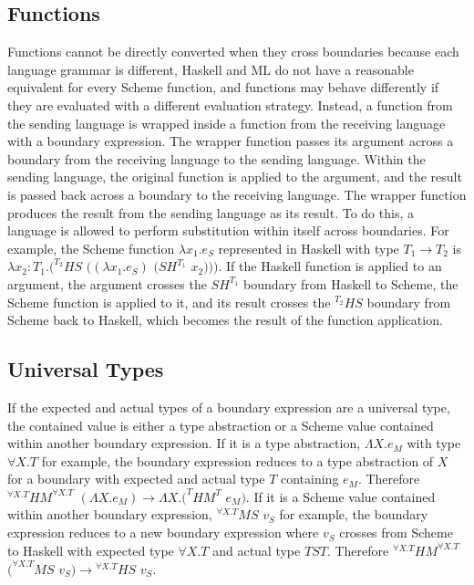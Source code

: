 \subsection{Functions}

Functions cannot be directly converted when they cross boundaries because each language grammar is different, Haskell and ML do not have a reasonable equivalent for every Scheme function, and functions may behave differently if they are evaluated with a different evaluation strategy.  Instead, a function from the sending language is wrapped inside a function from the receiving language with a boundary expression.  The wrapper function passes its argument across a boundary from the receiving language to the sending language.  Within the sending language, the original function is applied to the argument, and the result is passed back across a boundary to the receiving language.  The wrapper function produces the result from the sending language as its result.  To do this, a language is allowed to perform substitution within itself across boundaries.  For example, the Scheme function $\lambda x_{1}.e_{S}$ represented in Haskell with type $T_{1}\rightarrow T_{2}$ is $\lambda x_{2}:T_{1}.(^{T_{2}}HS$ $((\lambda x_{1}.e_{S})$ $(SH^{T_{1}}$ $x_{2})))$.  If the Haskell function is applied to an argument, the argument crosses the $SH^{T_{1}}$ boundary from Haskell to Scheme, the Scheme function is applied to it, and its result crosses the $^{T_{2}}HS$ boundary from Scheme back to Haskell, which becomes the result of the function application.

\subsection{Universal Types}

If the expected and actual types of a boundary expression are a universal type, the contained value is either a type abstraction or a Scheme value contained within another boundary expression.  If it is a type abstraction, $\Lambda X.e_{M}$ with type $\forall X.T$ for example, the boundary expression reduces to a type abstraction of $X$ for a boundary with expected and actual type $T$ containing $e_{M}$.  Therefore $^{\forall X.T}HM^{\forall X.T}$ $(\Lambda X.e_{M})\rightarrow\Lambda X.(^{T}HM^{T}$ $e_{M})$.  If it is a Scheme value contained within another boundary expression, $^{\forall X.T}MS$ $v_{S}$ for example, the boundary expression reduces to a new boundary expression where $v_{S}$ crosses from Scheme to Haskell with expected type $\forall X.T$ and actual type $TST$.  Therefore $^{\forall X.T}HM^{\forall X.T}$ $(^{\forall X.T}MS$ $v_{S})\rightarrow{^{\forall X.T}H}S$ $v_{S}$.

